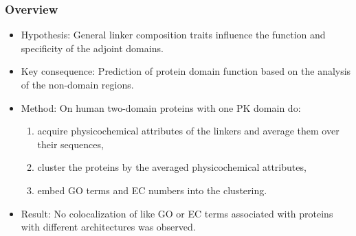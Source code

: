 \documentclass{beamer}
\title{\ThesisTitle}
\subtitle{\ThesisTypeName}
\author[\ThesisAuthor]{\ThesisAuthor \\ \small Supervisor: \Supervisor}
\institute[\UKFaculty]{\UKName \\ \UKFaculty}
\date{September 15\textsuperscript{th}, 2020}
\begin{document}
  \frame{\titlepage}

  \begin{frame}
    \frametitle{Overview}

    \begin{itemize}
      \item Hypothesis: General linker composition traits influence the function and
      specificity of the adjoint domains.
      \item Key consequence: Prediction of protein domain function based on the analysis
      of the non-domain regions.
      \item Method: On human two-domain proteins with one PK domain do:
        \begin{enumerate}
          \item acquire physicochemical attributes of the linkers and average them over
          their sequences,
          \item cluster the proteins by the averaged physicochemical attributes,
          \item embed GO terms and EC numbers into the clustering.
        \end{enumerate}
      \item Result: No colocalization of like GO or EC terms associated with proteins with
      different architectures was observed.
    \end{itemize}

  \end{frame}
\end{document}
